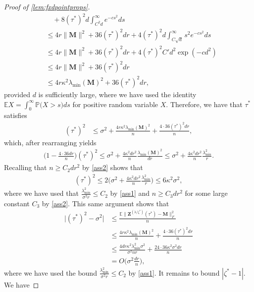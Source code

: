 \documentclass[10pt]{article}
\newcommand{\s}{^*}
\newcommand{\p}{\mathbb{P}}
\theoremstyle{definition}
\begin{document}
\begin{proof}[Proof of \cref{lem:fxdpointprops}]
\begin{align}
    &\quad + 8 (\tau\s)^2  d \int_{C^2 d}^{\infty}  e^{- c s^2} ds \\
    &\leq 4 r \| \bm{M} \|^2 + 36 (\tau\s)^2 d r 
    + 4 (\tau\s)^2  d \int_{C \sqrt{d}}^{\infty} s^2 e^{- c s^2} ds \\
    &\leq 4 r \| \bm{M} \|^2 + 36 (\tau\s)^2 d r 
    + 4 (\tau\s)^2  C' d^2 \exp( - c d^2) \\
    &\leq  4 r \| \bm{M} \|^2 + 36 (\tau\s)^2 d r \\
    &\leq 4 r \kappa^2 \lambda_{\min}(\bm{M})^2 + 36 (\tau\s)^2 d r,
\end{align}
provided $d$ is sufficiently large, where we have used the identity $\mathbb{E} X = \int_{0}^{\infty} \p\big( X > s \big) ds$
for positive random variable $X$.  
Therefore, we have that $\tau\s$ satisfies
\begin{align}
    (\tau\s)^2 &\leq \sigma^2 + \frac{4 r \kappa^2 \lambda_{\min}(\bm{M})^2}{n} + \frac{4 \cdot 36 (\tau\s)^2 dr}{n},
\end{align}
which, after rearranging   yields
\begin{align}
    \bigg( 1 - \frac{4 \cdot 36 dr}{n} \bigg) (\tau\s)^2 \leq \sigma^2 + \frac{4 \kappa^2 d r^2}{n} \frac{\lambda_{\min}(\bm{M})^2}{d r}  \leq \sigma^2 + \frac{4 \kappa^2 d r^2}{n} \frac{\lambda_{\min}^2}{r}.
\end{align}
Recalling that $n \geq C_2 d r^2$ by \cref{ass2} shows that
\begin{align}
    (\tau\s)^2 \leq 2\bigg( \sigma^2 +\frac{4 \kappa^2 d r^2}{n} \frac{\lambda_{\min}^2}{r} \bigg) \leq  6 \kappa^2 \sigma^2,
\end{align}
where we have used that $\frac{\lambda_{\min}^2}{\sigma^2 r} \leq C_2$ by \cref{ass1} and $n \geq C_3 d r^2$ for some large constant $C_3$ by \cref{ass2}.  
This same argument shows that
\begin{align}
    \bigg| (\tau\s)^2 - \sigma^2 \bigg| &\leq \frac{\mathbb{E} \| \bm{Z}^{(\lambda/\zeta\s)}(\tau\s) - \bm{M} \|_F^2}{n} \\
    &\leq \frac{4 r \kappa^2 \lambda_{\min}(\bm{M})^2}{n} + \frac{4 \cdot 36 (\tau\s)^2 dr}{n}  \\
    &\leq \frac{4 dr \kappa^2 \lambda_{\min}^2 \sigma^2}{\sigma^2 n r} + \frac{24 \cdot 36 \kappa^2  \sigma^2 d r}{n} \\&= O\bigg( \sigma^2\frac{dr}{n} \bigg),
\end{align}
where we have used the bound $\frac{\lambda_{\min}^2}{\sigma^2 r} \leq C_2$ by \cref{ass1}.  
It remains to bound $|\zeta\s - 1 |$.  We have

\end{proof}
\end{document}
